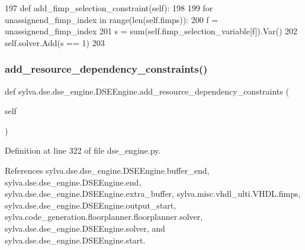 \begin{DoxyCode}
197     \textcolor{keyword}{def }add\_fimp\_selection\_constraint(self):
198 
199         \textcolor{keywordflow}{for} unassignend\_fimp\_index \textcolor{keywordflow}{in} range(len(self.fimps)):
200             f = unassignend\_fimp\_index
201             s = sum(self.fimp\_selection\_variable[f]).Var()
202             self.solver.Add(s == 1)
203 
\end{DoxyCode}
\mbox{\label{classsylva_1_1dse_1_1dse__engine_1_1_d_s_e_engine_a32018f5a2ead55e21e2e980d6ef86440}} 
\subsubsection{\texorpdfstring{add\+\_\+resource\+\_\+dependency\+\_\+constraints()}{add\_resource\_dependency\_constraints()}}
{\footnotesize\ttfamily def sylva.\+dse.\+dse\+\_\+engine.\+D\+S\+E\+Engine.\+add\+\_\+resource\+\_\+dependency\+\_\+constraints (\begin{DoxyParamCaption}\item[{}]{self }\end{DoxyParamCaption})}



Definition at line 322 of file dse\+\_\+engine.\+py.



References sylva.\+dse.\+dse\+\_\+engine.\+D\+S\+E\+Engine.\+buffer\+\_\+end, sylva.\+dse.\+dse\+\_\+engine.\+D\+S\+E\+Engine.\+end, sylva.\+dse.\+dse\+\_\+engine.\+D\+S\+E\+Engine.\+extra\+\_\+buffer, sylva.\+misc.\+vhdl\+\_\+ulti.\+V\+H\+D\+L.\+fimps, sylva.\+dse.\+dse\+\_\+engine.\+D\+S\+E\+Engine.\+output\+\_\+start, sylva.\+code\+\_\+generation.\+floorplanner.\+floorplanner.\+solver, sylva.\+dse.\+dse\+\_\+engine.\+D\+S\+E\+Engine.\+solver, and sylva.\+dse.\+dse\+\_\+engine.\+D\+S\+E\+Engine.\+start.


